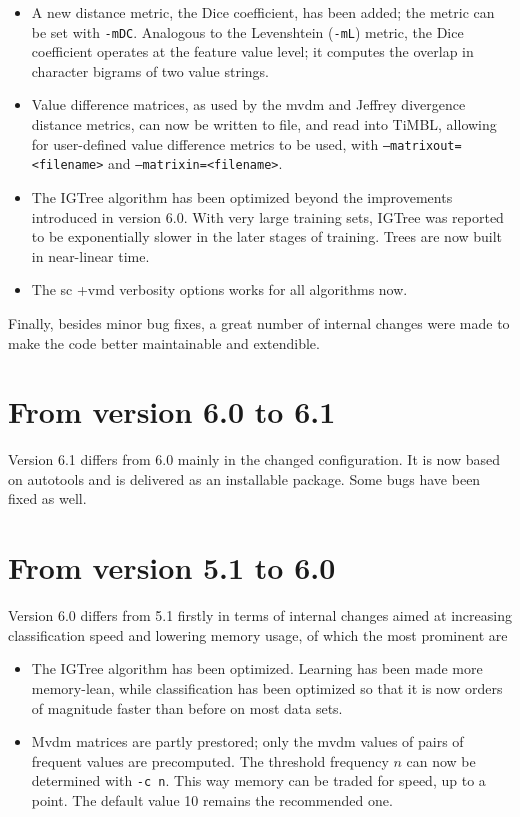 \documentclass{report}
\begin{document}
\begin{itemize}

\item A new distance metric, the Dice coefficient, has been added; the metric can be set with {\tt -mDC}. Analogous to the Levenshtein ({\tt -mL}) metric, the Dice coefficient operates at the feature value level; it computes the overlap in character bigrams of two value strings.

\item Value difference matrices, as used by the {\sc mvdm} and Jeffrey divergence distance metrics, can now be written to file, and read into TiMBL, allowing for user-defined value difference metrics to be used, with {\tt --matrixout=<filename>} and {\tt --matrixin=<filename>}.

\item The {\sc IGTree} algorithm has been optimized beyond the improvements introduced in version 6.0. With very large training sets, {\sc IGTree} was reported to be exponentially slower in the later stages of training. Trees are now built in near-linear time.

\item The {sc +vmd} verbosity options works for all algorithms now. 

\end{itemize}


Finally, besides minor bug fixes, a great number of internal changes were made to make the code better maintainable and extendible.

\section{From version 6.0 to 6.1}

Version 6.1 differs from 6.0 mainly in the changed configuration.  It is now based on autotools and is delivered as an installable package.  Some bugs have been fixed as well.

\section{From version 5.1 to 6.0}

Version 6.0 differs from 5.1 firstly in terms of internal changes aimed at increasing classification speed and lowering memory usage, of which the most prominent are

\begin{itemize}

\item The {\sc IGTree} algorithm has been optimized. Learning has been
  made more memory-lean, while classification has been optimized so
  that it is now orders of magnitude faster than before on most data sets.

\item {\sc Mvdm} matrices are partly prestored; only the {\sc mvdm}
  values of pairs of frequent values are precomputed. The threshold
  frequency $n$ can now be determined with {\tt -c n}. This way memory
  can be traded for speed, up to a point. The default value 10 remains
  the recommended one.

\end{itemize}
\end{document}
